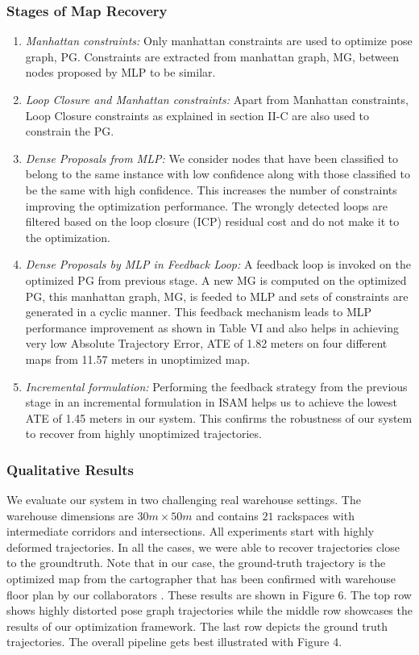 \documentclass[letterpaper, 10 pt, conference]{ieeeconf}  %
\begin{document}
	\subsubsection{Stages of Map Recovery}
	\begin{enumerate}[label=(\roman*]
		\item \textit{Manhattan constraints: } Only manhattan constraints are used to optimize pose graph, PG. Constraints are extracted from manhattan graph, MG, between nodes proposed by MLP to be similar. 
		\item \textit{Loop Closure and Manhattan constraints: } Apart from Manhattan constraints, Loop Closure constraints as explained in section II-C are also used to constrain the PG. 
		\item \textit{Dense Proposals from MLP: } We consider nodes that have been classified to belong to the same instance with low confidence along with those classified to be the same with high confidence. This increases the number of constraints improving the optimization performance. The wrongly detected loops are filtered based on the loop closure (ICP) residual cost and do not make it to the optimization.
		\item \textit{Dense Proposals by MLP in Feedback Loop: } A feedback loop is invoked on the optimized PG from previous stage. A new MG is computed on the optimized PG, this manhattan graph, MG, is feeded to MLP and sets of constraints are generated in a cyclic manner. This feedback mechanism leads to MLP performance improvement as shown in Table VI and also helps in achieving very low Absolute Trajectory Error, ATE of 1.82 meters on four different maps from 11.57 meters in unoptimized map.
		\item \textit{Incremental formulation: } Performing the feedback strategy from the previous stage in an incremental formulation in ISAM \cite{kaess2008isam} helps us to achieve the lowest ATE of 1.45 meters in our system. This confirms the robustness of our system to recover from highly unoptimized trajectories.
	\end{enumerate}
	
	\subsubsection{Qualitative Results}
	
	We evaluate our system in two challenging real warehouse settings. The warehouse dimensions are $30m \times 50m$ and contains $21$ rackspaces with intermediate corridors and intersections. All experiments  start with highly deformed trajectories. In all the cases, we were able to recover trajectories close to the groundtruth. Note that in our case, the ground-truth trajectory is the optimized map from the cartographer that has been confirmed with warehouse floor plan by our collaborators . These results are shown in Figure 6. The top row shows highly distorted pose graph trajectories while the middle row showcases the results of our optimization framework. The last row depicts the ground truth trajectories. The overall pipeline gets best illustrated with Figure 4.
	
\end{document}
